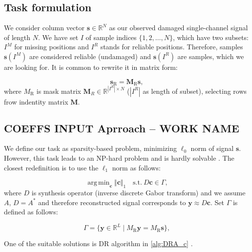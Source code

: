\documentclass[conference]{IEEEtran}
\begin{document}
\subsection{Task formulation}

We consider column vector $ \mathbf{s} \in \mathbb{R}^{N} $ as our observed damaged single-channel signal of length $ N $.
We have set $ I $ of sample indices $ \{1,2,\dots,N\} $, which have two subsets: $ I^M $ for missing positions and $ I^R $ stands for reliable positions.
Therefore, samples $ \mathbf{s}(I^M) $ are considered reliable (undamaged) and $ \mathbf{s}(I^R) $ are samples, which we are looking for.
It is common to rewrite it in matrix form:

\begin{equation*}
	\mathbf{s}_{\mathrm{R}} = \mathbf{M}_{\mathrm{R}}\mathbf{s},
\end{equation*}
where $  M_{\mathrm{R}} $ is mask matrix $\mathbf{M}_{R} \in \mathbb{R} ^ { |I^R| \times N}$ ($ |I^R|$ as length of subset), selecting rows frow indentity matrix $ \mathbf{M} $\cite{Adler2012}.




\subsection{COEFFS INPUT Aprroach -- WORK NAME}\label{subsec:freqcoef}

We define our task as sparsity-based problem, minimizing $ \ell_0 $ norm of signal $ \mathbf{s} $.
However, this task leads to an NP-hard problem and is hardly solvable \cite{Mokry2020}.
The closest redefinition is to use the $ \ell_1 $ norm as follows:

\begin{equation*}
 \mathop {\operatorname{arg \, min}}_\mathbf {c}\Vert \mathbf {c}\Vert _1 \quad \text{s.t.}\ D\mathbf {c}\in \Gamma, \tag{1}
\end{equation*} 
where $ D $ is synthesis operator (inverse discrete Gabor transform) and we assume $ A $, $ D = A^* $ and therefore reconstructed signal corresponds to $ \mathbf {y} \approx  D\mathbf {c}$.
Set $ \Gamma $ is defined as follows:

\begin{equation*} \Gamma = \lbrace \mathbf {y}\in \mathbb {R}^L\mid M_{\mathrm{R}}\mathbf {y}=M_{\mathrm{R}}\mathbf {s}\rbrace, \tag{2}\end{equation*}

One of the suitable solutions is DR algorithm in \ref{alg:DRA_c} \cite{Mokry2020}.
\end{document}
